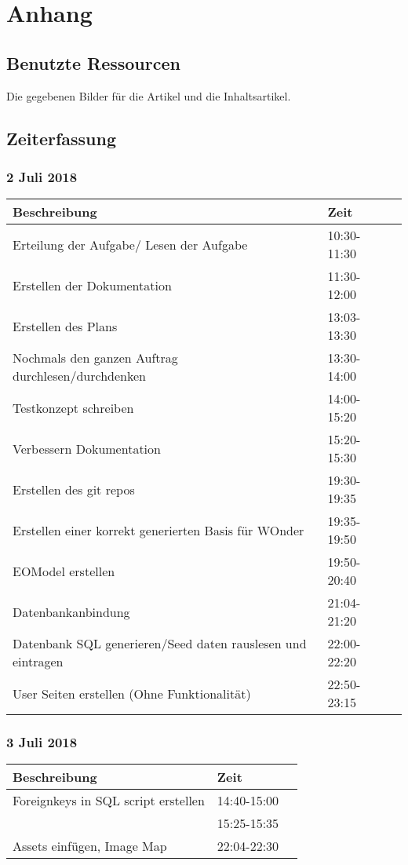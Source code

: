 \documentclass[a4paper, 11pt]{article}
\begin{document}
\section{Anhang}

\subsection{Benutzte Ressourcen}

Die gegebenen Bilder für die Artikel und die Inhaltsartikel.

\subsection{Zeiterfassung}

\subsubsection{2 Juli 2018}

\begin{tabular}{llr}
\toprule
Beschreibung & Zeit \\
\midrule
Erteilung der Aufgabe/ Lesen der Aufgabe & 10:30-11:30 \\
Erstellen der Dokumentation & 11:30-12:00 \\
Erstellen des Plans & 13:03-13:30 \\
Nochmals den ganzen Auftrag durchlesen/durchdenken & 13:30-14:00 \\
Testkonzept schreiben & 14:00-15:20 \\
Verbessern Dokumentation & 15:20-15:30 \\
Erstellen des git repos & 19:30-19:35 \\
Erstellen einer korrekt generierten Basis  für WOnder & 19:35-19:50 \\
EOModel erstellen & 19:50-20:40 \\
Datenbankanbindung & 21:04-21:20 \\
Datenbank SQL generieren/Seed daten rauslesen und eintragen & 22:00-22:20 \\
User Seiten erstellen (Ohne Funktionalität) & 22:50-23:15 \\
\bottomrule
\end{tabular}

\subsubsection{3 Juli 2018}

\begin{tabular}{llr}
\toprule
Beschreibung & Zeit \\
\midrule
Foreignkeys in SQL script erstellen & 14:40-15:00 \\
 & 15:25-15:35 \\
Assets einfügen, Image Map & 22:04-22:30 \\
\bottomrule
\end{tabular}
\end{document}
